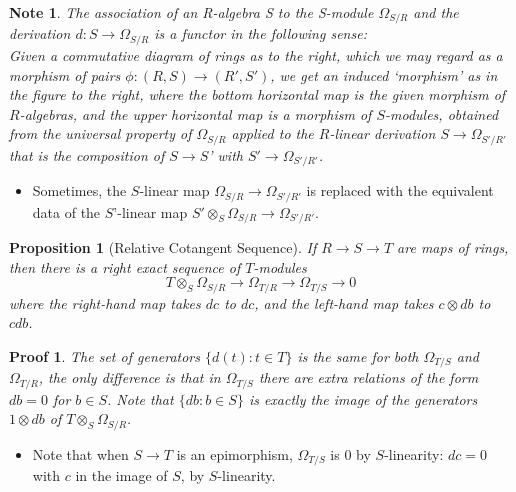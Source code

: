 \documentclass{beamer}
\newtheorem{prop}{Proposition}
\newtheorem{n}{Note}
\newtheorem{prf}{Proof}
\begin{document}

\begin{frame}
\begin{small}
\begin{n}
The association of an R-algebra S to the S-module $\Omega_{S/R}$ and the derivation $d:S\to\Omega_{S/R}$ is a functor in the following sense: 
\\Given a commutative diagram of rings as to the right, which we may regard as a morphism of pairs $\phi:(R,S)\to(R',S')$, we get an induced `morphism' as in the figure to the right, where the bottom horizontal map is the given morphism of $R$-algebras, and the upper horizontal map is a morphism of $S$-modules, obtained from the universal property of $\Omega_{S/R}$ applied to the $R$-linear derivation $S\to\Omega_{S'/R'}$ that is the composition of $S\to S$' with $S'\to\Omega_{S'/R'}$. 
\end{n}

\begin{itemize}
\item Sometimes, the $S$-linear map $\Omega_{S/R}\to\Omega_{S'/R'}$ is replaced with the equivalent data of the $S$'-linear map $S'\otimes_S\Omega_{S/R}\to\Omega_{S'/R'}$.
\end{itemize}

\end{small}
\end{frame}


\begin{frame}
\begin{small}
\begin{prop}[Relative Cotangent Sequence]
If $R\to S\to T$ are maps of rings, then there is a right exact sequence of $T$-modules 
$$T\otimes_S\Omega_{S/R}\to\Omega_{T/R}\to\Omega_{T/S}\to0$$
where the right-hand map takes $dc$ to $dc$, and the left-hand map takes $c\otimes db$ to $cdb$. 
\end{prop}


\begin{prf}
The set of generators $\{d(t):t\in T\}$ is the same for both $\Omega_{T/S}$ and $\Omega_{T/R}$, the only difference is that in $\Omega_{T/S}$ there are extra relations of the form $db = 0$ for $b\in S$. Note that $\{db : b\in S\}$ is exactly the image of the generators $1\otimes db$ of $T\otimes_S\Omega_{S/R}$. 
\end{prf}


\begin{itemize}
\item Note that when $S\to T$ is an epimorphism, $\Omega_{T/S}$ is 0 by $S$-linearity: $dc = 0$ with $c$ in the image of $S$, by $S$-linearity. 
\end{itemize}


\end{small}
\end{frame}
\end{document}
